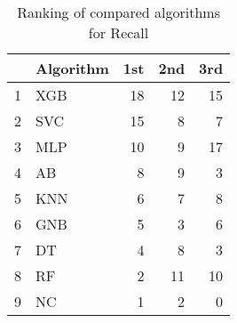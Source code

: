 \begin{table}
\footnotesize
\caption{Ranking of compared algorithms for Recall}
\label{tab:places Recall}
\begin{tabular}{llrrr}
\hline
 & Algorithm & 1st & 2nd & 3rd \\
\hline
1 & XGB & 18 & 12 & 15 \\
2 & SVC & 15 & 8 & 7 \\
3 & MLP & 10 & 9 & 17 \\
4 & AB & 8 & 9 & 3 \\
5 & KNN & 6 & 7 & 8 \\
6 & GNB & 5 & 3 & 6 \\
7 & DT & 4 & 8 & 3 \\
8 & RF & 2 & 11 & 10 \\
9 & NC & 1 & 2 & 0 \\
\hline
\end{tabular}
\end{table}
